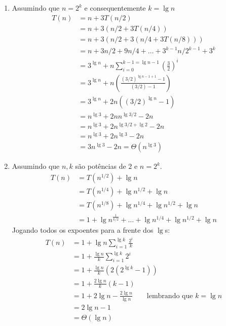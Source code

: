 \documentclass{article}
\begin{document}
\begin{enumerate}
\begin{enumerate}
		\item Assumindo que $n=2^k$ e consequentemente $k = \lg n$
		\begin{align*}
			T(n) &= n + 3T(n/2) \\
			&= n + 3(n/2 + 3T(n/4)) \\
			&= n + 3(n/2 + 3(n/4 + 3T(n/8))) \\
			&= n + 3n/2 + 9n/4 + \ldots + 3^{k-1}n/2^{k-1} + 3^k \\
			&= 3^{\lg n}+n\sum_{i=0}^{k-1=\lg n-1}\left(\frac{3}{2}\right)^i \\
			&= 3^{\lg n}+n\left(\frac{(3/2)^{\lg n -1+1}-1}{(3/2)-1}\right) \\
			&= 3^{\lg n} + 2n \left((3/2)^{\lg n}-1\right) \\
			&= n^{\lg 3} + 2nn^{\lg 3/2} - 2n \\
			&= n^{\lg 3} + 2n^{\lg 3/2 + \lg 2} - 2n \\
			&= n^{\lg 3} + 2n^{\lg 3} - 2n \\
			&= 3 n^{\lg 3} - 2n = \Theta(n^{\lg 3})
		\end{align*}

		\item Assumindo que $n, k$ são potências de $2$ e $n=2^k$.
		\begin{align*}
			T(n) &= T(n^{1/2}) + \lg n \\
			&= T(n^{1/4}) + \lg n^{1/2} + \lg n \\
			&= T(n^{1/8}) + \lg n^{1/4} + \lg n^{1/2} + \lg n \\
			&= 1 + \lg n^{\frac{1}{k/2}} + \ldots +
				\lg n^{1/4} + \lg n^{1/2} + \lg n
		\end{align*}
		Jogando todos os expoentes para a frente dos $\lg$s:
		\begin{align*}
			T(n) &= 1 + \lg n \sum_{i=1}^{\lg k}\frac{2^i}{k} \\
			&= 1 + \frac{\lg n}{k} \sum_{i=1}^{\lg k}2^i \\
			&= 1 + \frac{\lg n}{k} (2(2^{\lg k} - 1)) \\
			&= 1 + \frac{2 \lg n}{k} (k - 1) \\
			&= 1+2\lg n -\frac{2 \lg n}{\lg n}
				\qquad\text{lembrando que $k=\lg n$} \\
			&= 2\lg n - 1 \\
			&= \Theta(\lg n)
		\end{align*}

	\end{enumerate}


\end{enumerate}
\end{document}

